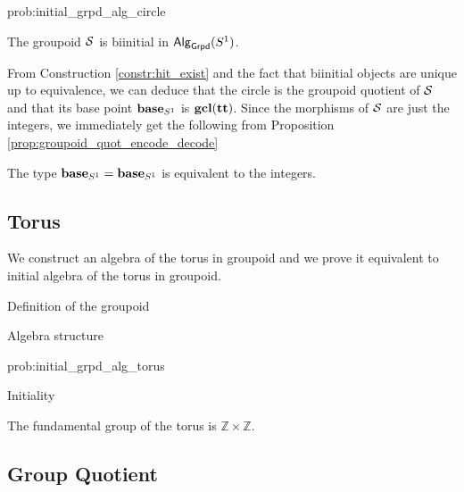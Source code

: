 \begin{construction}{prob:initial_grpd_alg_circle}

\end{construction}

\begin{proposition}
The groupoid $\mathcal{S}$ is biinitial in $\mathsf{Alg}_{\mathsf{Grpd}}(S^1)$.
\end{proposition}

From Construction \ref{constr:hit_exist} and the fact that biinitial objects are unique up to equivalence,
we can deduce that the circle is the groupoid quotient of $\mathcal{S}$ and that its base point $\operatorname{\mathbf{base}}_{S^1}$ is $\operatorname{\mathbf{gcl}}(\operatorname{\mathbf{tt}})$.
Since the morphisms of $\mathcal{S}$ are just the integers, we immediately get the following from Proposition \ref{prop:groupoid_quot_encode_decode}

\begin{corollary}
The type $\operatorname{\mathbf{base}}_{S^1} = \operatorname{\mathbf{base}}_{S^1}$ is equivalent to the integers.
\end{corollary}

\subsection{Torus}
\label{sec:torus_fund_group}

We construct an algebra of the torus in groupoid and we prove it
equivalent to initial algebra of the torus in groupoid.

\begin{definition}
  Definition of the groupoid
\end{definition}

\begin{problem}
  \label{prob:initial_grpd_alg_torus}
  Algebra structure
\end{problem}

\begin{construction}{prob:initial_grpd_alg_torus}

\end{construction}

\begin{proposition}
  Initiality
\end{proposition}

\begin{corollary}
  The fundamental group of the torus is $\mathbb{Z} \times \mathbb{Z}$.
\end{corollary}

\subsection{Group Quotient}
\label{sec:group_quotient_fund_group}

